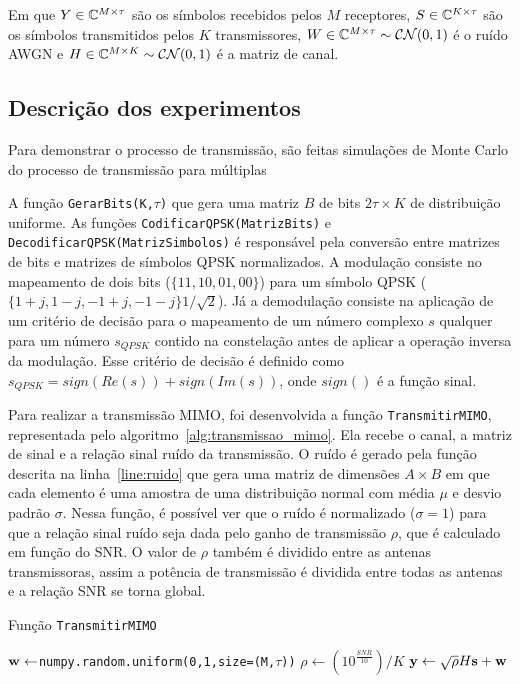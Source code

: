 \documentclass{article}
\begin{document}
Em que $Y\in\mathbb{C}^{M\times\tau}$ são os símbolos recebidos pelos $M$ receptores, $S\in\mathbb{C}^{K\times\tau}$ são os símbolos transmitidos pelos $K$ transmissores, $W\in\mathbb{C}^{M\times\tau}\sim\mathcal{C}\mathcal{N}(0,1)$ é o ruído AWGN e $H\in\mathbb{C}^{M\times K}\sim\mathcal{C}\mathcal{N}(0,1)$ é a matriz de canal. 

\subsection{Descrição dos experimentos}

Para demonstrar o processo de transmissão, são feitas simulações de Monte Carlo do processo de transmissão para múltiplas

A função \texttt{GerarBits(K,$\tau$)} que gera uma matriz $B$ de bits $2\tau\times K$ de distribuição uniforme. As funções \texttt{CodificarQPSK(MatrizBits)} e \texttt{DecodificarQPSK(MatrizSimbolos)} é responsável pela conversão entre matrizes de bits e matrizes de símbolos QPSK normalizados. A modulação consiste no mapeamento de dois bits ($\{11,10,01,00\}$) para um símbolo QPSK ($\{1+j,1-j,-1+j,-1-j\}1/\sqrt{2}$). Já a demodulação consiste na aplicação de um critério de decisão para o mapeamento de um número complexo $s$ qualquer para um número $s_{QPSK}$ contido na constelação antes de aplicar a operação inversa da modulação. Esse critério de decisão é definido como $s_{QPSK}=sign(Re(s))+sign(Im(s))$, onde $sign()$ é a função sinal.

Para realizar a transmissão MIMO, foi desenvolvida a função \texttt{TransmitirMIMO}, representada pelo algoritmo~\ref{alg:transmissao_mimo}. Ela recebe o canal, a matriz de sinal e a relação sinal ruído da transmissão. O ruído é gerado pela função descrita na linha~\ref{line:ruido} que gera uma matriz de dimensões $A\times B$ em que cada elemento é uma amostra de uma distribuição normal com média $\mu$ e desvio padrão $\sigma$. Nessa função, é possível ver que o ruído é normalizado ($\sigma=1$) para que a relação sinal ruído seja dada pelo ganho de transmissão $\rho$, que é calculado em função do SNR. O valor de $\rho$ também é dividido entre as antenas transmissoras, assim a potência de transmissão é dividida entre todas as antenas e a relação SNR se torna global. 

\begin{algorithm}
    \label{alg:transmissao_mimo}
    \caption{Função \texttt{TransmitirMIMO}}
    \KwResult{$\ybf$}
    $\mathbf{w} \gets $\texttt{numpy.random.uniform(0,1,size=(M,$\tau$))}\; \label{line:ruido}
    $\rho \gets (10^{\frac{SNR}{10}})/K$\;
    $\mathbf{y} \gets \sqrt{\rho}H\mathbf{s}+\mathbf{w}$\;
\end{algorithm}
\end{document}
